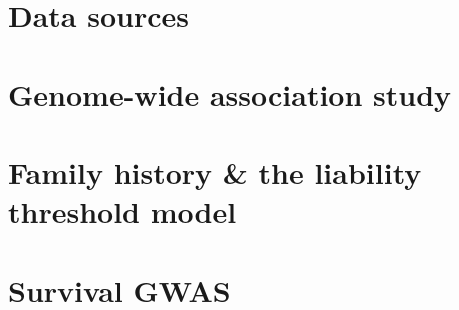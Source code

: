 \section{Data sources}




\section{Genome-wide association study}


%

\section{Family history \& the liability threshold model}


\section{Survival GWAS}






